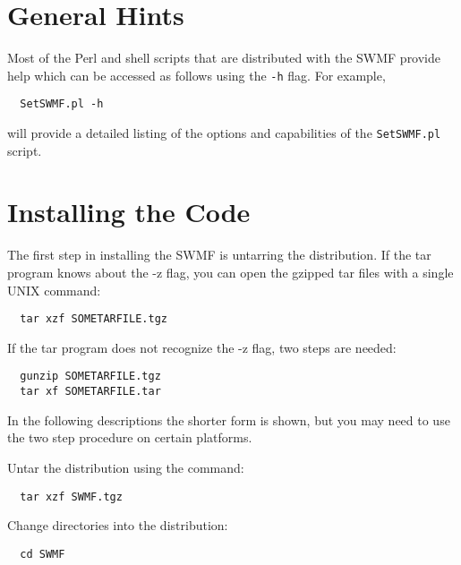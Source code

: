 \section{General Hints}

Most of the Perl and shell scripts that are distributed with the SWMF
provide help which can be accessed as follows using the {\tt -h} flag.
For example, 
\begin{verbatim}
  SetSWMF.pl -h
\end{verbatim}
will provide a detailed listing of the options and capabilities of the
{\tt SetSWMF.pl} script.


\section{Installing the Code}

The first step in installing the SWMF is untarring the distribution.
If the tar program knows about the -z flag, you can open the gzipped
tar files with a single UNIX command:
\begin{verbatim}
  tar xzf SOMETARFILE.tgz
\end{verbatim}
If the tar program does not recognize the -z flag, two steps are needed:
\begin{verbatim}
  gunzip SOMETARFILE.tgz
  tar xf SOMETARFILE.tar
\end{verbatim}
In the following descriptions the shorter form is shown, but you may
need to use the two step procedure on certain platforms.

Untar the distribution using the command:
\begin{verbatim}
  tar xzf SWMF.tgz
\end{verbatim}

Change directories into the distribution:
\begin{verbatim}
  cd SWMF
\end{verbatim}

